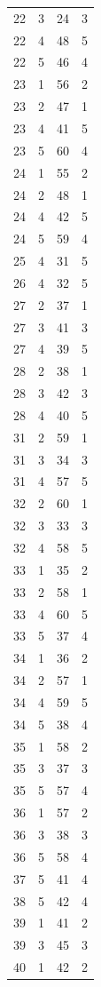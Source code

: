\documentclass[a4paper, amsfonts, amssymb, amsmath, reprint, showkeys, nofootinbib, oneside]{revtex4-1}
\begin{document}
\begin{longtable}[h!]{ cccc }
	22 & 3 & 24 & 3 \\
	22 & 4 & 48 & 5 \\
	22 & 5 & 46 & 4 \\
	23 & 1 & 56 & 2 \\
	23 & 2 & 47 & 1 \\
	23 & 4 & 41 & 5 \\
	23 & 5 & 60 & 4 \\
	24 & 1 & 55 & 2 \\
	24 & 2 & 48 & 1 \\
	24 & 4 & 42 & 5 \\
	24 & 5 & 59 & 4 \\
	25 & 4 & 31 & 5 \\
	26 & 4 & 32 & 5 \\
	27 & 2 & 37 & 1 \\
	27 & 3 & 41 & 3 \\
	27 & 4 & 39 & 5 \\
	28 & 2 & 38 & 1 \\
	28 & 3 & 42 & 3 \\
	28 & 4 & 40 & 5 \\
	31 & 2 & 59 & 1 \\
	31 & 3 & 34 & 3 \\
	31 & 4 & 57 & 5 \\
	32 & 2 & 60 & 1 \\
	32 & 3 & 33 & 3 \\
	32 & 4 & 58 & 5 \\
	33 & 1 & 35 & 2 \\
	33 & 2 & 58 & 1 \\
	33 & 4 & 60 & 5 \\
	33 & 5 & 37 & 4 \\
	34 & 1 & 36 & 2 \\
	34 & 2 & 57 & 1 \\
	34 & 4 & 59 & 5 \\
	34 & 5 & 38 & 4 \\
	35 & 1 & 58 & 2 \\
	35 & 3 & 37 & 3 \\
	35 & 5 & 57 & 4 \\
	36 & 1 & 57 & 2 \\
	36 & 3 & 38 & 3 \\
	36 & 5 & 58 & 4 \\
	37 & 5 & 41 & 4 \\
	38 & 5 & 42 & 4 \\
	39 & 1 & 41 & 2 \\
	39 & 3 & 45 & 3 \\
	40 & 1 & 42 & 2 \\

\end{longtable}
\end{document}

